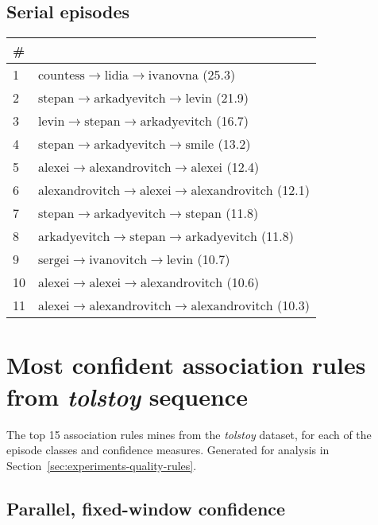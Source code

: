 \begin{appendices}
\section{Serial episodes}

\begin{longtable}{p{20pt}|p{\dimexpr\textwidth-20pt-\tabcolsep\relax}}
\# & \\
\hline
1 & $ \text{countess} \to \text{lidia} \to \text{ivanovna} $ (25.3) \\
2 & $ \text{stepan} \to \text{arkadyevitch} \to \text{levin} $ (21.9) \\
3 & $ \text{levin} \to \text{stepan} \to \text{arkadyevitch} $ (16.7) \\
4 & $ \text{stepan} \to \text{arkadyevitch} \to \text{smile} $ (13.2) \\
5 & $ \text{alexei} \to \text{alexandrovitch} \to \text{alexei} $ (12.4) \\
6 & $ \text{alexandrovitch} \to \text{alexei} \to \text{alexandrovitch} $ (12.1) \\
7 & $ \text{stepan} \to \text{arkadyevitch} \to \text{stepan} $ (11.8) \\
8 & $ \text{arkadyevitch} \to \text{stepan} \to \text{arkadyevitch} $ (11.8) \\
9 & $ \text{sergei} \to \text{ivanovitch} \to \text{levin} $ (10.7) \\
10 & $ \text{alexei} \to \text{alexei} \to \text{alexandrovitch} $ (10.6) \\
11 & $ \text{alexei} \to \text{alexandrovitch} \to \text{alexandrovitch} $ (10.3) \\
\end{longtable}
\fi

\chapter{%
Most confident association rules from \emph{tolstoy} sequence
}
\label{appendix:confident-association-rules}

The top 15 association rules mines from the \emph{tolstoy} dataset, for each of the episode classes and confidence measures. Generated for analysis in Section~\ref{sec:experiments-quality-rules}.

\section{Parallel, fixed-window confidence}
\label{appendix:rules-par-fwi}


\end{appendices}
